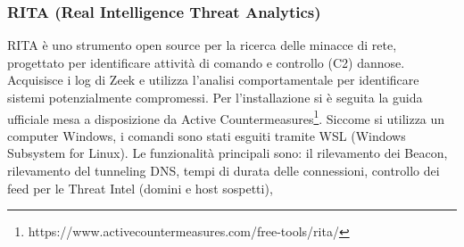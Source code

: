 

\subsubsection*{RITA (Real Intelligence Threat Analytics)}\label{strumenti:RITA} %
RITA \cite{rita} è uno strumento open source per la ricerca delle minacce di rete, 
progettato per identificare attività di comando e controllo (C2) dannose.
Acquisisce i log di Zeek e utilizza l'analisi comportamentale per identificare sistemi potenzialmente compromessi.
Per l'installazione si è seguita la guida ufficiale mesa a disposizione da Active Countermeasures\footnote{
    https://www.activecountermeasures.com/free-tools/rita/
}. 
Siccome si utilizza un computer Windows, i comandi sono stati esguiti tramite WSL (Windows Subsystem for Linux). 
\vspace{2ex} \newline 
Le funzionalità principali sono: 
il rilevamento dei Beacon, %
rilevamento del tunneling DNS, %
tempi di durata delle connessioni, 
controllo dei feed per le Threat Intel (domini e host sospetti), %
